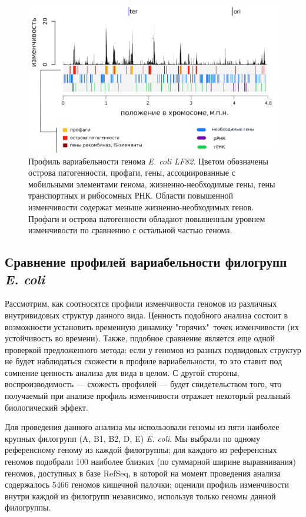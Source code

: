 \begin{figure}[!ht] 
  \center
    \includegraphics[width=\textwidth]{Dissertation/images/complexity/figure5plus2.png}
  \caption{Профиль вариабельности генома \textit{E. coli LF82}. Цветом обозначены острова патогенности, профаги, гены, ассоциированные с мобильными элементами генома, жизненно-необходимые гены, гены транспортных и рибосомных РНК. Области повышенной изменчивости содержат меньше жизненно-необходимых генов. Профаги и острова патогенности обладают повышенным уровнем изменчивости по сравнению с остальной частью генома.}
  \label{img:complexity_lf82} 
\end{figure}


\subsection{Сравнение профилей вариабельности филогрупп \textit{E. coli}}
Рассмотрим, как соотносятся профили изменчивости геномов из различных внутривидовых структур данного вида. Ценность подобного анализа состоит в возможности установить временную динамику "горячих"\ точек изменчивости (их устойчивость во времени). Также, подобное сравнение является еще одной проверкой предложенного метода: если у геномов из разных подвидовых структур не будет наблюдаться схожести в профиле вариабельности, то это ставит под сомнение ценность анализа для вида в целом. С другой стороны, воспроизводимость --- схожесть профилей --- будет свидетельством того, что получаемый при анализе профиль изменчивости отражает некоторый реальный биологический эффект. 

Для проведения данного анализа мы использовали геномы из пяти наиболее крупных филогрупп (A, B1, B2, D, E) \textit{E. coli}. Мы выбрали по одному референсному геному из каждой филогруппы; для каждого из референсных геномов подобрали 100 наиболее близких (по суммарной ширине выравнивания) геномов, доступных в базе RefSeq, в которой на момент проведения анализа содержалось 5466 геномов кишечной палочки; оценили профиль изменчивости внутри каждой из филогрупп независимо, используя только геномы данной филогруппы. 

